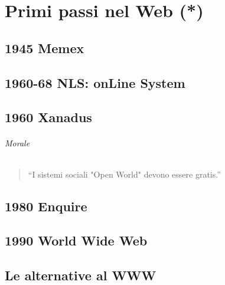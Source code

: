 

\chapter{Primi passi nel Web (*)}
	
	\section{1945 Memex}
		
	\section{1960-68 NLS: onLine System}
		
	\section{1960 Xanadus}
		
	\subparagraph*{Morale}
			\begin{quote}
				``I sistemi sociali "Open World" devono essere gratis.''
			\end{quote}
		
	\section{1980 Enquire}
		
	\section{1990 World Wide Web}
		
	\section{Le alternative al WWW}
